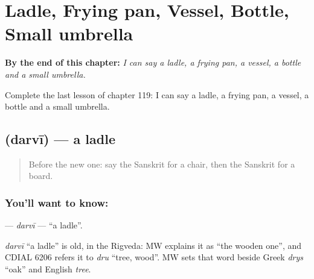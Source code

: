 
\chapter{Ladle, Frying pan, Vessel, Bottle, Small umbrella}
\label{ch:sa-ladle-frying-pan-vessel-bottle-small-umbrella}

\begin{chapteropening}
\textbf{By the end of this chapter:} \emph{I can say a ladle, a frying pan, a vessel, a bottle and a small umbrella.}

Complete the last lesson of chapter 119: I can say a ladle, a frying pan, a vessel, a bottle and a small umbrella.
\end{chapteropening}

\section[\texorpdfstring{\sk{दर्वी} (darvī)}{दर्वी (darvī)}]{ (darvī) — a ladle}

\label{lesson:SA-C119-darvi}



\begin{quote}
Before the new one: say the Sanskrit for a chair, then the Sanskrit for a board.
\end{quote}

\subsection*{You'll want to know: }
\textbf{} — \emph{darvī} — \textquotedblleft{}a ladle\textquotedblright{}.

\begin{cousinweb}
\emph{darvī} \textquotedblleft{}a ladle\textquotedblright{} is old, in the Rigveda: MW explains it as \textquotedblleft{}the wooden one\textquotedblright{}, and CDIAL 6206 refers it to \emph{dru} \textquotedblleft{}tree, wood\textquotedblright{}. MW sets that word beside Greek \emph{drys} \textquotedblleft{}oak\textquotedblright{} and English \emph{tree}.
\end{cousinweb}

